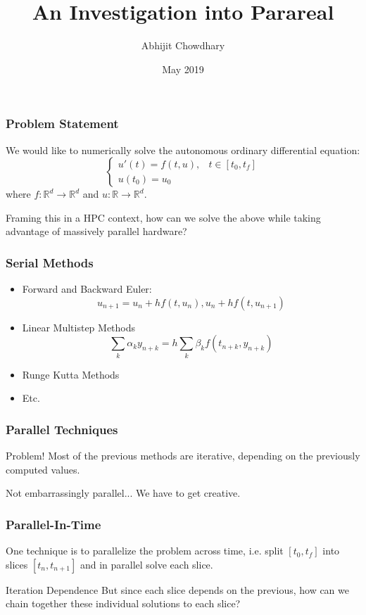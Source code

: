 \documentclass[pdf,12pt]{beamer}
\title{An Investigation into Parareal}
\author{Abhijit Chowdhary}
\institute{New York University}
\date{May 2019}
\begin{document}
 
\frame{\titlepage}

\begin{frame}
  \frametitle{Problem Statement}
  We would like to numerically solve the autonomous ordinary differential
  equation:
  \begin{equation*}
    \begin{cases}
      u'(t) = f(t, u), & t \in [t_0, t_f] \\
      u(t_0) = u_0
    \end{cases}
  \end{equation*}
  where $f : \mathbb{R}^d \to \mathbb{R}^d$ and $u: \mathbb{R} \to \mathbb{R}^d$.

  Framing this in a HPC context, how can we solve the above while taking
  advantage of massively parallel hardware?
\end{frame}

\begin{frame}
  \frametitle{Serial Methods}
  \begin{itemize}
    \item <1-> Forward and Backward Euler:
      \[
        u_{n+1} = u_n +  h f(t, u_n), u_n + h f(t,u_{n+1})
      \]
    \item <2-> Linear Multistep Methods
      \[
        \sum_k \alpha_k y_{n+k} = h\sum_k\beta_k f(t_{n+k},y_{n+k})
      \]
    \item <3-> Runge Kutta Methods
    \item <4-> Etc.
  \end{itemize}
\end{frame}

\begin{frame}
  \frametitle{Parallel Techniques}
  \begin{alertblock}{Problem!}
    Most of the previous methods are iterative, depending on the previously
    computed values.
  \end{alertblock}
  Not embarrassingly parallel... We have to get creative.
\end{frame}

\begin{frame}
  \frametitle{Parallel-In-Time}
  One technique is to parallelize the problem across time, i.e. split $[t_0,
  t_f]$ into slices $[t_n, t_{n+1}]$ and in parallel solve each slice.
  \begin{block}{Iteration Dependence}
    But since each slice depends on the previous, how can we chain together
    these individual solutions to each slice?
  \end{block}
\end{frame}
\end{document}
